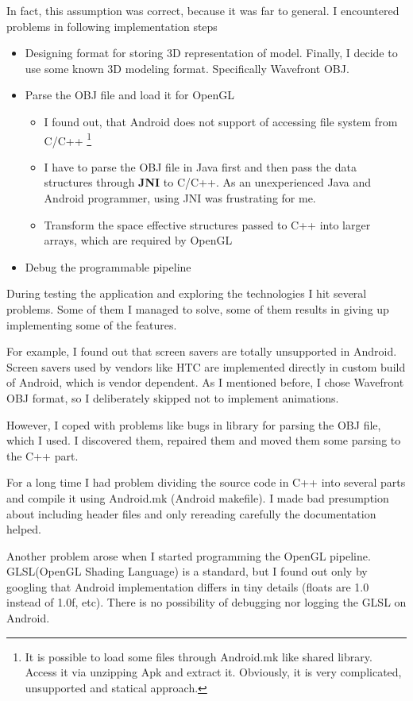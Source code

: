 In fact, this assumption was correct, because it was far to general.
I encountered problems in following implementation steps
\begin{itemize}
    \item Designing format for storing 3D representation of model. Finally, I decide to use some known 3D modeling format. Specifically Wavefront OBJ.
    \item Parse the OBJ file and load it for OpenGL
        \begin{itemize}
            \item I found out, that Android does not support of accessing file system from C/C++ \footnote{It is possible to load some files through Android.mk like shared library. Access it via unzipping Apk and extract it. Obviously, it is very complicated, unsupported and statical approach.}
            \item I have to parse the OBJ file in Java first and then pass the data structures through {\bf JNI} to C/C++.
            As an unexperienced Java and Android programmer, using JNI was frustrating for me. 
            \item Transform the space effective structures passed to C++ into larger arrays, which are required by OpenGL
        \end{itemize}
    \item Debug the programmable pipeline
\end{itemize}

During testing the application and exploring the technologies I hit several problems.
Some of them I managed to solve, some of them results in giving up implementing some of the features.

For example, I found out that screen savers are totally unsupported in Android. Screen savers
used by vendors like HTC are implemented directly in custom build of Android, which is vendor dependent.
As I mentioned before, I chose Wavefront OBJ format, so I deliberately skipped not to implement animations.

However, I coped with problems like bugs in library for parsing the OBJ file, which I used. 
I discovered them, repaired them and moved them some parsing to the C++ part.
    
For a long time I had problem dividing the source code in C++ into several parts
and compile it using Android.mk (Android makefile). I made bad presumption about including header files and
only rereading carefully the documentation helped.

Another problem arose when I started programming the OpenGL pipeline.
GLSL(OpenGL Shading Language) is a standard, 
but I found out  only by googling
that Android implementation differs in tiny details (floats are 1.0 instead of 1.0f, etc).
There is no possibility of debugging nor logging the GLSL on Android.

